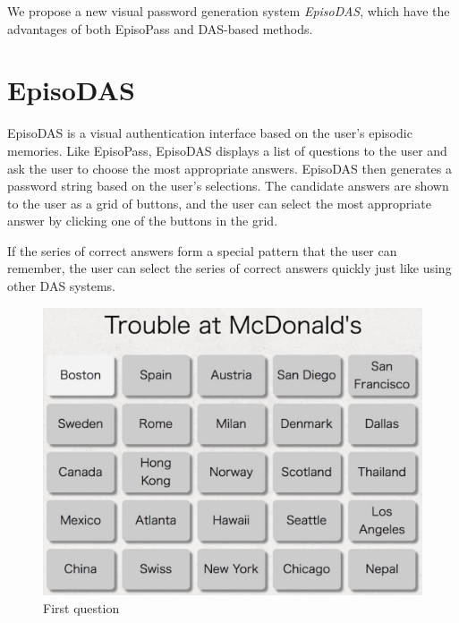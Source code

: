 \documentclass[sigconf]{acmart}
\begin{document}
We propose a new visual password generation system \textit{EpisoDAS},
which have the advantages of both EpisoPass and DAS-based methods.

\section{EpisoDAS}

EpisoDAS is a visual authentication interface
based on the user's episodic memories.
Like EpisoPass,
EpisoDAS displays a list of questions to the user and
ask the user to choose the most appropriate answers.
EpisoDAS then generates a password string based on the user's selections.
%
% 
%
The candidate answers are shown to the user as a grid of buttons,
and the user can select the most appropriate answer
by clicking one of the buttons in the grid.

If the series of correct answers form a special pattern
that the user can remember,
the user can select the series of correct answers quickly
just like using other DAS systems.


\begin{figure}[H]
  \includegraphics[width=12cm,bb=0 0 1398 1060]{figures/EpisoDAS1.jpg}
  \caption{First question}
  \label{EpisoDAS1}
\end{figure}
\end{document}
